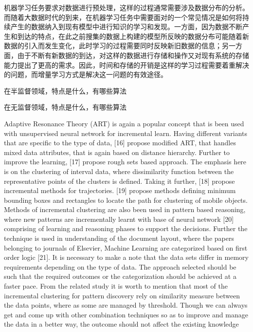 机器学习任务要求对数据进行预处理，这样的过程通常需要涉及数据分布的分析。而随着大数据时代的到来，在机器学习任务中需要面对的一个常见情况是如何将持续产生的数据纳入到现有模型中进行知识的学习和发现。一方面，因为数据不断产生和到达的特点，在此之前搜集的数据上构建的模型所反映的数据分布可能随着新数据的引入而发生变化，此时学习的过程需要同时反映新旧数据的信息；另一方面，由于不断有新数据的到达，对这样的数据进行存储和操作又对现有系统的存储能力提出了更高的需求。因此，时间和存储的开销是这样的学习过程需要着重解决的问题，而增量学习方式是解决这一问题的有效途径。


在半监督领域，特点是什么，有哪些算法


在无监督领域，特点是什么，有哪些算法

Adaptive Resonance Theory (ART) is again a popular concept that is been used with unsupervised neural network for incremental learn. Having different variants that are specific to the type of data, [16] propose modified ART, that handles mixed data attributes, that is again based on distance hierarchy. Further to improve the learning, [17] propose rough sets based approach. The emphasis here is on the clustering of interval data, where dissimilarity function between the representative points of the clusters is defined. Taking it further, [18] propose incremental methods for trajectories. [19] propose methods defining minimum bounding boxes and rectangles to locate the path for clustering of mobile objects.
Methods of incremental clustering are also been used in pattern based reasoning, where new patterns are incrementally learnt with base of neural network [20] comprising of learning and reasoning phases to support the decisions. Further the technique is used in understanding of the document layout, where the papers belonging to journals of Elsevier, Machine Learning are categorized based on first order logic [21].
It is necessary to make a note that the data sets differ in memory requirements depending on the type of data. The approach selected should be such that the required outcomes or the categorization should be achieved at a faster pace.
From the related study it is worth to mention that most of the incremental clustering for pattern discovery rely on similarity measure between the data points, where as some are managed by threshold. Though we can always get and come up with other combination techniques so as to improve and manage the data in a better way, the outcome should not affect the existing knowledge


